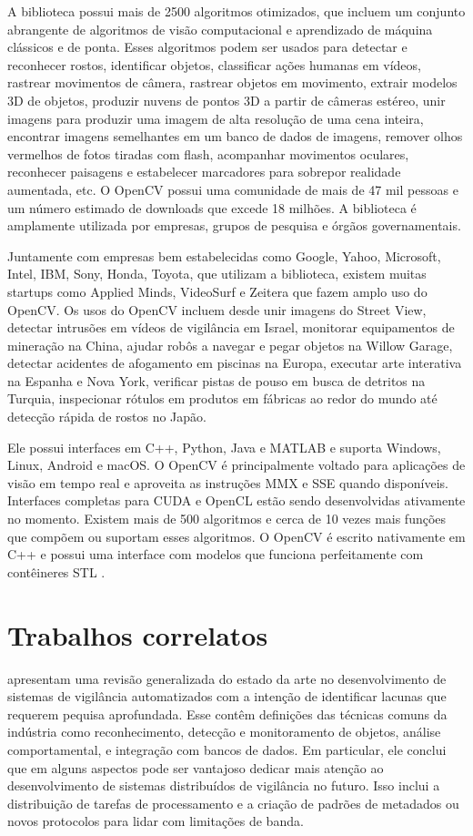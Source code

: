 \documentclass[12pt, %
openright, 
oneside, %
a4paper,    %
brazil]{facom-ufu-abntex2}
\begin{document}
A biblioteca possui mais de 2500 algoritmos otimizados, que incluem um conjunto
abrangente de algoritmos de visão computacional e aprendizado de máquina
clássicos e de ponta. Esses algoritmos podem ser usados para detectar e
reconhecer rostos, identificar objetos, classificar ações humanas em vídeos,
rastrear movimentos de câmera, rastrear objetos em movimento, extrair modelos
3D de objetos, produzir nuvens de pontos 3D a partir de câmeras estéreo, unir
imagens para produzir uma imagem de alta resolução de uma cena inteira,
encontrar imagens semelhantes em um banco de dados de imagens, remover olhos
vermelhos de fotos tiradas com flash, acompanhar movimentos oculares,
reconhecer paisagens e estabelecer marcadores para sobrepor realidade
aumentada, etc. O OpenCV possui uma comunidade de mais de 47 mil pessoas e um
número estimado de downloads que excede 18 milhões. A biblioteca é amplamente
utilizada por empresas, grupos de pesquisa e órgãos governamentais.

Juntamente com empresas bem estabelecidas como Google, Yahoo, Microsoft, Intel,
IBM, Sony, Honda, Toyota, que utilizam a biblioteca, existem muitas startups
como Applied Minds, VideoSurf e Zeitera que fazem amplo uso do OpenCV. Os usos
do OpenCV incluem desde unir imagens do Street View, detectar intrusões em
vídeos de vigilância em Israel, monitorar equipamentos de mineração na China,
ajudar robôs a navegar e pegar objetos na Willow Garage, detectar acidentes de
afogamento em piscinas na Europa, executar arte interativa na Espanha e Nova
York, verificar pistas de pouso em busca de detritos na Turquia, inspecionar
rótulos em produtos em fábricas ao redor do mundo até detecção rápida de rostos
no Japão.

Ele possui interfaces em C++, Python, Java e MATLAB e suporta Windows, Linux,
Android e macOS. O OpenCV é principalmente voltado para aplicações de visão em
tempo real e aproveita as instruções MMX e SSE quando disponíveis. Interfaces
completas para CUDA e OpenCL estão sendo desenvolvidas ativamente no momento.
Existem mais de 500 algoritmos e cerca de 10 vezes mais funções que compõem ou
suportam esses algoritmos. O OpenCV é escrito nativamente em C++ e possui uma
interface com modelos que funciona perfeitamente com contêineres STL
\cite{opencvwebsite}.

\section{Trabalhos correlatos}

 apresentam uma revisão generalizada do
estado da arte no desenvolvimento de sistemas de vigilância automatizados com a
intenção de identificar lacunas que requerem pequisa aprofundada. Esse contêm
definições das técnicas comuns da indústria como reconhecimento, detecção e
monitoramento de objetos, análise comportamental, e integração com bancos de
dados. Em particular, ele conclui que em alguns aspectos pode ser vantajoso
dedicar mais atenção ao desenvolvimento de sistemas distribuídos de vigilância
no futuro. Isso inclui a distribuição de tarefas de processamento e a criação
de padrões de metadados ou novos protocolos para lidar com limitações de banda.
\end{document}
